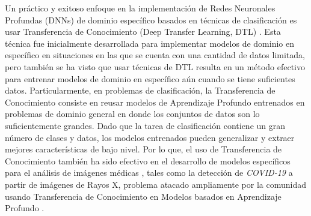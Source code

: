 Un práctico y exitoso enfoque en la implementación de Redes Neuronales Profundas (DNNs) de dominio
específico \cite{liu2017survey} basados en técnicas de clasificación es usar Transferencia de
Conocimiento (Deep Transfer Learning, DTL) \cite{long2016unsupervised,oquab2014learning,tan2018survey}.
Esta técnica fue inicialmente desarrollada para implementar modelos de dominio en específico en
situaciones en las que se cuenta con una cantidad de datos limitada, pero también se ha visto que
usar técnicas de DTL resulta en un método efectivo para entrenar modelos de dominio en específico aún
cuando se tiene suficientes datos. Particularmente, en problemas de clasificación, la Transferencia
de Conocimiento consiste en reusar modelos de Aprendizaje Profundo entrenados en problemas de
dominio general en donde los conjuntos de datos son lo suficientemente grandes. Dado que la tarea de
clasificación contiene un gran número de clases y datos, los modelos entrenados pueden generalizar y
extraer mejores características de bajo nivel. Por lo que, el uso de Transferencia de Conocimiento
también ha sido efectivo en el desarrollo de modelos específicos para el análisis de imágenes médicas
\cite{deniz2018transfer,litjens2017survey, sufian2020survey}, tales como la detección de
\textit{COVID-19} a partir de imágenes de Rayos X, problema atacado ampliamente por la comunidad
usando Transferencia de Conocimiento en Modelos basados en Aprendizaje Profundo
\cite{agrawal2021focuscovid,ai2020correlation,sufian2020survey}.

